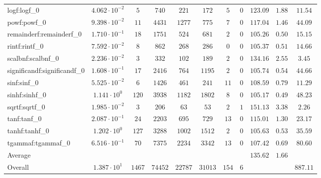 \begin{tabular}{|l|c|c|c|c|c|c|c|c|c|c|}
logf:logf\_0                 & $ 4.062 \cdot 10^{-2} $ & $ 5      $ & $ 740   $ & $ 221   $ & $ 172   $ & $ 5   $ & $ 0 $ & $ 123.09      $ & $ 1.88    $ & $ 11.54   $ \\
powf:powf\_0                 & $ 9.398 \cdot 10^{-2} $ & $ 11     $ & $ 4431  $ & $ 1277  $ & $ 775   $ & $ 7   $ & $ 0 $ & $ 117.04      $ & $ 1.46    $ & $ 44.09   $ \\
remainderf:remainderf\_0     & $ 1.710 \cdot 10^{-1} $ & $ 18     $ & $ 1751  $ & $ 524   $ & $ 681   $ & $ 2   $ & $ 0 $ & $ 105.26      $ & $ 0.50    $ & $ 15.15   $ \\
rintf:rintf\_0               & $ 7.592 \cdot 10^{-2} $ & $ 8      $ & $ 862   $ & $ 268   $ & $ 286   $ & $ 0   $ & $ 0 $ & $ 105.37      $ & $ 0.51    $ & $ 14.66   $ \\
scalbnf:scalbnf\_0           & $ 2.236 \cdot 10^{-2} $ & $ 3      $ & $ 332   $ & $ 102   $ & $ 189   $ & $ 2   $ & $ 0 $ & $ 134.16      $ & $ 2.55    $ & $ 3.45    $ \\
significandf:significandf\_0 & $ 1.608 \cdot 10^{-1} $ & $ 17     $ & $ 2416  $ & $ 764   $ & $ 1195  $ & $ 2   $ & $ 0 $ & $ 105.74      $ & $ 0.54    $ & $ 44.66   $ \\
sinf:sinf\_0                 & $ 5.525 \cdot 10^{-2} $ & $ 6      $ & $ 1426  $ & $ 461   $ & $ 241   $ & $ 11  $ & $ 0 $ & $ 108.59      $ & $ 0.79    $ & $ 11.29   $ \\
sinhf:sinhf\_0               & $ 1.141 \cdot 10^{0}  $ & $ 120    $ & $ 3938  $ & $ 1182  $ & $ 1802  $ & $ 8   $ & $ 0 $ & $ 105.17      $ & $ 0.49    $ & $ 48.23   $ \\
sqrtf:sqrtf\_0               & $ 1.985 \cdot 10^{-2} $ & $ 3      $ & $ 206   $ & $ 63    $ & $ 53    $ & $ 2   $ & $ 1 $ & $ 151.13      $ & $ 3.38    $ & $ 2.26    $ \\
tanf:tanf\_0                 & $ 2.087 \cdot 10^{-1} $ & $ 24     $ & $ 2203  $ & $ 695   $ & $ 729   $ & $ 13  $ & $ 0 $ & $ 115.01      $ & $ 1.30    $ & $ 23.17   $ \\
tanhf:tanhf\_0               & $ 1.202 \cdot 10^{0}  $ & $ 127    $ & $ 3288  $ & $ 1002  $ & $ 1512  $ & $ 2   $ & $ 0 $ & $ 105.63      $ & $ 0.53    $ & $ 35.59   $ \\
tgammaf:tgammaf\_0           & $ 6.516 \cdot 10^{-1} $ & $ 70     $ & $ 7375  $ & $ 2234  $ & $ 3342  $ & $ 13  $ & $ 0 $ & $ 107.42      $ & $ 0.69    $ & $ 80.60   $ \\
\hline
Average                      & $                     $ & $        $ & $       $ & $       $ & $       $ & $     $ & $   $ & $ 135.62      $ & $ 1.66    $ & $         $ \\
\hline
Overall                      & $ 1.387 \cdot 10^{1}  $ & $ 1467   $ & $ 74452 $ & $ 22787 $ & $ 31013 $ & $ 154 $ & $ 6 $ & $             $ & $         $ & $ 887.11  $ \\
\hline
\end{tabular}
